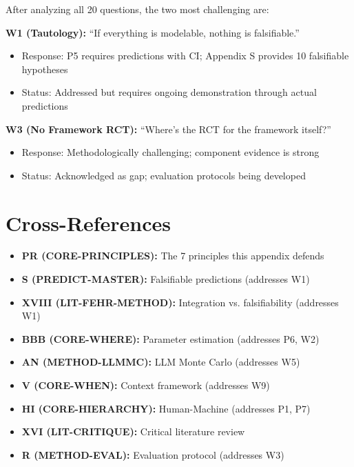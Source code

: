 \begin{tcolorbox}[colback=gray!5!white, colframe=gray!75!black,
    title=The Two Strongest Objections]

After analyzing all 20 questions, the two most challenging are:

\textbf{W1 (Tautology):} ``If everything is modelable, nothing is falsifiable.''
\begin{itemize}[nosep]
    \item Response: P5 requires predictions with CI; Appendix S provides 10 falsifiable hypotheses
    \item Status: Addressed but requires ongoing demonstration through actual predictions
\end{itemize}

\textbf{W3 (No Framework RCT):} ``Where's the RCT for the framework itself?''
\begin{itemize}[nosep]
    \item Response: Methodologically challenging; component evidence is strong
    \item Status: Acknowledged as gap; evaluation protocols being developed
\end{itemize}

\end{tcolorbox}

\section{Cross-References}
\label{sec:da-crossref}

\begin{itemize}[nosep]
    \item \textbf{PR (CORE-PRINCIPLES):} The 7 principles this appendix defends
    \item \textbf{S (PREDICT-MASTER):} Falsifiable predictions (addresses W1)
    \item \textbf{XVIII (LIT-FEHR-METHOD):} Integration vs. falsifiability (addresses W1)
    \item \textbf{BBB (CORE-WHERE):} Parameter estimation (addresses P6, W2)
    \item \textbf{AN (METHOD-LLMMC):} LLM Monte Carlo (addresses W5)
    \item \textbf{V (CORE-WHEN):} Context framework (addresses W9)
    \item \textbf{HI (CORE-HIERARCHY):} Human-Machine (addresses P1, P7)
    \item \textbf{XVI (LIT-CRITIQUE):} Critical literature review
    \item \textbf{R (METHOD-EVAL):} Evaluation protocol (addresses W3)
\end{itemize}

